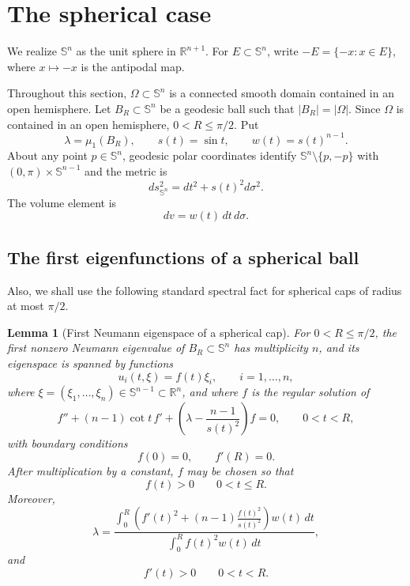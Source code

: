 \documentclass[10pt,a4paper]{amsart}
\newtheorem{lemma}[theorem]{Lemma}
\newcommand{\RR}{\mathbb R}
\newcommand{\Sn}{\mathbb S}
\begin{document}
\section{The spherical case}\label{sec4}

We realize $\Sn^n$ as the unit sphere in $\RR^{n+1}$.  For $E\subset\Sn^n$, write $-E=\{-x:x\in E\}$, where $x\mapsto -x$ is the antipodal map.

Throughout this section, $\Omega\subset\Sn^n$ is a connected smooth domain contained in an open hemisphere.  Let $B_R\subset\Sn^n$ be a geodesic ball such that $|B_R|=|\Omega|$.  Since $\Omega$ is contained in an open hemisphere, $0<R\le\pi/2$.  Put
$$
        \lambda=\mu_1(B_R),
        \qquad
        s(t)=\sin t,
        \qquad
        w(t)=s(t)^{n-1}.
$$
About any point $p\in\Sn^n$, geodesic polar coordinates identify $\Sn^n\setminus\{p,-p\}$ with $(0,\pi)\times\Sn^{n-1}$ and the metric is
\begin{equation}\label{eq:sphere-polar-metric}
        ds_{\Sn^n}^2=dt^2+s(t)^2d\sigma^2.
\end{equation}
The volume element is
$$
        dv=w(t)\,dt\,d\sigma.
$$


\subsection{The first eigenfunctions of a spherical ball}

Also, we shall use the following standard spectral fact for spherical caps of radius at most $\pi/2$.

\begin{lemma}[First Neumann eigenspace of a spherical cap]\label{lem:sphere-ball-facts}
For $0<R\le\pi/2$, the first nonzero Neumann eigenvalue of $B_R\subset\Sn^n$ has multiplicity $n$, and its eigenspace is spanned by functions
$$
        u_i(t,\xi)=f(t)\xi_i,
        \qquad i=1,\dots,n,
$$
where $\xi=(\xi_1,\dots,\xi_n)\in\Sn^{n-1}\subset\RR^n$, and where $f$ is the regular solution of
\begin{equation}\label{eq:sphere-ball-ode}
        f''+(n-1)\cot t\,f'
        +\left(\lambda-\frac{n-1}{s(t)^2}\right)f=0,
        \qquad 0<t<R,
\end{equation}
with boundary conditions
\begin{equation}\label{eq:sphere-ball-bc}
        f(0)=0,
        \qquad
        f'(R)=0.
\end{equation}
After multiplication by a constant, $f$ may be chosen so that
$$
        f(t)>0\qquad 0<t\le R.
$$
Moreover,
\begin{equation}\label{eq:sphere-ball-rayleigh}
        \lambda
        =\frac{\displaystyle\int_0^R\left(f'(t)^2+(n-1)\frac{f(t)^2}{s(t)^2}\right)w(t)\,dt}
        {\displaystyle\int_0^R f(t)^2w(t)\,dt},
\end{equation}
and
\begin{equation}\label{eq:sphere-f-prime-positive}
        f'(t)>0\qquad 0<t<R.
\end{equation}
\end{lemma}
\end{document}
